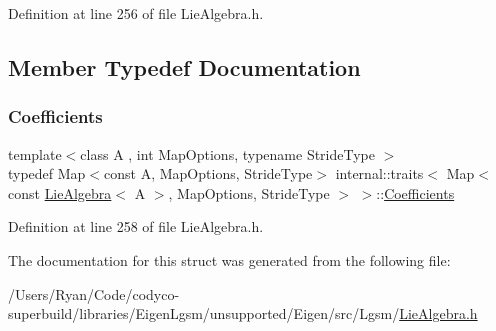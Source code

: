 Definition at line 256 of file Lie\+Algebra.\+h.



\subsection{Member Typedef Documentation}
\hypertarget{structinternal_1_1traits_3_01_map_3_01const_01_lie_algebra_3_01_a_01_4_00_01_map_options_00_01_stride_type_01_4_01_4_a674c3c33e67dbce98e62c32725b274da}{}\label{structinternal_1_1traits_3_01_map_3_01const_01_lie_algebra_3_01_a_01_4_00_01_map_options_00_01_stride_type_01_4_01_4_a674c3c33e67dbce98e62c32725b274da} 
\subsubsection{\texorpdfstring{Coefficients}{Coefficients}}
{\footnotesize\ttfamily template$<$class A , int Map\+Options, typename Stride\+Type $>$ \\
typedef Map$<$const A, Map\+Options, Stride\+Type$>$ internal\+::traits$<$ Map$<$ const \hyperlink{class_lie_algebra}{Lie\+Algebra}$<$ A $>$, Map\+Options, Stride\+Type $>$ $>$\+::\hyperlink{structinternal_1_1traits_3_01_map_3_01const_01_lie_algebra_3_01_a_01_4_00_01_map_options_00_01_stride_type_01_4_01_4_a674c3c33e67dbce98e62c32725b274da}{Coefficients}}



Definition at line 258 of file Lie\+Algebra.\+h.



The documentation for this struct was generated from the following file\+:\begin{DoxyCompactItemize}
\item 
/\+Users/\+Ryan/\+Code/codyco-\/superbuild/libraries/\+Eigen\+Lgsm/unsupported/\+Eigen/src/\+Lgsm/\hyperlink{_lie_algebra_8h}{Lie\+Algebra.\+h}\end{DoxyCompactItemize}
